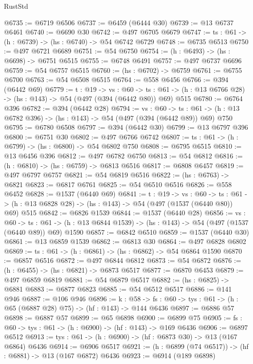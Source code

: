 \begin{lexlean}{RustStd}
\begin{coremodule}
{\begin{coremodule}
{{{{{{{{{{{{@6735 := @6719 @6506
@6737 := @6459 (@6444 @30)
@6739 := @13 @6737 @6461
@6740 := @6690 @30
@6742 := @497 @6705 @6679
@6747 := {ts : @61} -> (h : @6739) -> (hs : @6740) -> @54 @6742 @6729
@6748 := @6735 @6513
@6750 := @497 @6721 @6689
@6751 := @54 @6750
@6754 := (h : @6493) -> (hs : @6698) -> @6751 @6515
@6755 := @6748 @6491
@6757 := @497 @6737 @6696
@6759 := @54 @6757 @6515
@6760 := (hs : @6702) -> @6759
@6761 := @6755 @6700
@6763 := @54 @6508 @6515
@6764 := @558 @6456
@6766 := @394 (@6442 @69)
@6779 := {t : @19} ->
  {vs : @60} ->
  {ts : @61} -> (h : @13 @6766 @28) -> (hs : @143) -> @54 (@497 (@394 (@6442 @80)) @69) @515
@6780 := @6764 @396
@6782 := @394 (@6442 @28)
@6794 := {vs : @60} ->
  {ts : @61} -> (h : @13 @6782 @396) -> (hs : @143) -> @54 (@497 (@394 (@6442 @89)) @69) @750
@6795 := @6780 @6508
@6797 := @394 (@6442 @30)
@6799 := @13 @6797 @396
@6800 := @6751 @30
@6802 := @497 @6766 @6742
@6807 := {ts : @61} -> (h : @6799) -> (hs : @6800) -> @54 @6802 @750
@6808 := @6795 @6515
@6810 := @13 @6456 @396
@6812 := @497 @6782 @6750
@6813 := @54 @6812
@6816 := (h : @6810) -> (hs : @6759) -> @6813 @6516
@6817 := @6808 @6457
@6819 := @497 @6797 @6757
@6821 := @54 @6819 @6516
@6822 := (hs : @6763) -> @6821
@6823 := @6817 @6761
@6825 := @54 @6510 @6516
@6826 := @558 @6452
@6828 := @1537 (@6440 @69)
@6841 := {t : @19} ->
  {vs : @60} ->
  {ts : @61} -> (h : @13 @6828 @28) -> (hs : @143) -> @54 (@497 (@1537 (@6440 @80)) @69) @515
@6842 := @6826 @1539
@6844 := @1537 (@6440 @28)
@6856 := {vs : @60} ->
  {ts : @61} -> (h : @13 @6844 @1539) -> (hs : @143) -> @54 (@497 (@1537 (@6440 @89)) @69) @1590
@6857 := @6842 @6510
@6859 := @1537 (@6440 @30)
@6861 := @13 @6859 @1539
@6862 := @6813 @30
@6864 := @497 @6828 @6802
@6869 := {ts : @61} -> (h : @6861) -> (hs : @6862) -> @54 @6864 @1590
@6870 := @6857 @6516
@6872 := @497 @6844 @6812
@6873 := @54 @6872
@6876 := (h : @6455) -> (hs : @6821) -> @6873 @6517
@6877 := @6870 @6453
@6879 := @497 @6859 @6819
@6881 := @54 @6879 @6517
@6882 := (hs : @6825) -> @6881
@6883 := @6877 @6823
@6885 := @54 @6512 @6517
@6886 := @141 @946
@6887 := @106 @946
@6896 := {k : @58} ->
  {fs : @60} -> {tys : @61} -> (h : @65 (@6887 @28) @75) -> (hf : @143) -> @144 @6436
@6897 := @6886 @57
@6898 := @6887 @57
@6899 := @65 @6898
@6900 := @6899 @75
@6905 := {fs : @60} -> {tys : @61} -> (h : @6900) -> (hf : @143) -> @169 @6436
@6906 := @6897 @6512
@6913 := {tys : @61} -> (h : @6900) -> (hf : @6873 @30) -> @13 (@167 @6864) @6436
@6914 := @6906 @6517
@6921 := (h : @6899 (@74 @6517)) -> (hf : @6881) -> @13 (@167 @6872) @6436
@6923 := @6914 (@189 @6898)
}}}}}}}}}}}}
\end{coremodule}}
\end{coremodule}
\end{lexlean}
